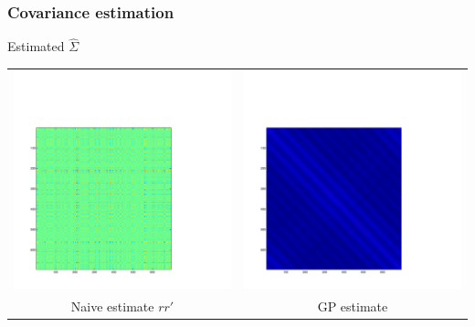 \documentclass{beamer}
\begin{document}
\begin{frame}
\frametitle{Covariance estimation}
Estimated $\hat{\Sigma}$
\begin{tabular}{cc}
\includegraphics[scale=0.2]{ex2_data2_cov1.pdf} & 
\includegraphics[scale=0.2]{ex2_data2_cov2.pdf}\\
Naive estimate $rr'$ & GP estimate 
\end{tabular}
\end{frame}
\end{document}
